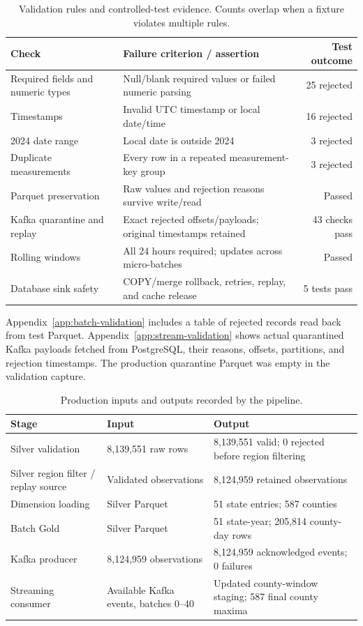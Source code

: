\documentclass[11pt,letterpaper]{article}
\begin{document}
\begin{table}[htbp]
\centering
\caption{Validation rules and controlled-test evidence. Counts overlap when a fixture violates multiple rules.}
\label{tab:quality}
\small
\begin{tabularx}{\linewidth}{@{}XXr@{}}
\toprule
Check & Failure criterion / assertion & Test outcome \\
\midrule
Required fields and numeric types & Null/blank required values or failed numeric parsing & 25 rejected \\
Timestamps & Invalid UTC timestamp or local date/time & 16 rejected \\
2024 date range & Local date is outside 2024 & 3 rejected \\
Duplicate measurements & Every row in a repeated measurement-key group & 3 rejected \\
Parquet preservation & Raw values and rejection reasons survive write/read & Passed \\
Kafka quarantine and replay & Exact rejected offsets/payloads; original timestamps retained & 43 checks pass \\
Rolling windows & All 24 hours required; updates across micro-batches & Passed \\
Database sink safety & COPY/merge rollback, retries, replay, and cache release & 5 tests pass \\
\bottomrule
\end{tabularx}
\end{table}

Appendix~\ref{app:batch-validation} includes a table of rejected records read
back from test Parquet. Appendix~\ref{app:stream-validation} shows actual
quarantined Kafka payloads fetched from PostgreSQL, their reasons, offsets,
partitions, and rejection timestamps. The production quarantine Parquet was
empty in the validation capture.

\begin{table}[htbp]
\centering
\caption{Production inputs and outputs recorded by the pipeline.}
\label{tab:stage-counts}
\small
\begin{tabularx}{\linewidth}{@{}XXX@{}}
\toprule
Stage & Input & Output \\
\midrule
Silver validation & 8,139,551 raw rows & 8,139,551 valid; 0 rejected before region filtering \\
Silver region filter / replay source & Validated observations & 8,124,959 retained observations \\
Dimension loading & Silver Parquet & 51 state entries; 587 counties \\
Batch Gold & Silver Parquet & 51 state-year; 205,814 county-day rows \\
Kafka producer & 8,124,959 observations & 8,124,959 acknowledged events; 0 failures \\
Streaming consumer & Available Kafka events, batches 0--40 & Updated county-window staging; 587 final county maxima \\
\bottomrule
\end{tabularx}
\end{table}
\end{document}
